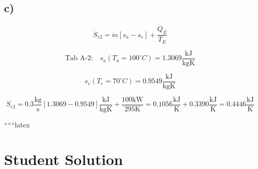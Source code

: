 

\subsection*{c)}
\[
\dot{S}_{e2} = \dot{m} \left[ s_a - s_e \right] + \frac{\dot{Q}_E}{T_E}
\]

\[
\text{Tab A-2:} \quad s_a (T_a = 100^\circ C) = 1.3069 \frac{\text{kJ}}{\text{kgK}}
\]

\[
s_e (T_e = 70^\circ C) = 0.9549 \frac{\text{kJ}}{\text{kgK}}
\]

\[
\dot{S}_{e2} = 0.3 \frac{\text{kg}}{\text{s}} \left[ 1.3069 - 0.9549 \right] \frac{\text{kJ}}{\text{kgK}} + \frac{100 \text{kW}}{295 \text{K}} = 0.1056 \frac{\text{kJ}}{\text{K}} + 0.3390 \frac{\text{kJ}}{\text{K}} = 0.4446 \frac{\text{kJ}}{\text{K}}
\]

``````latex


\section*{Student Solution}